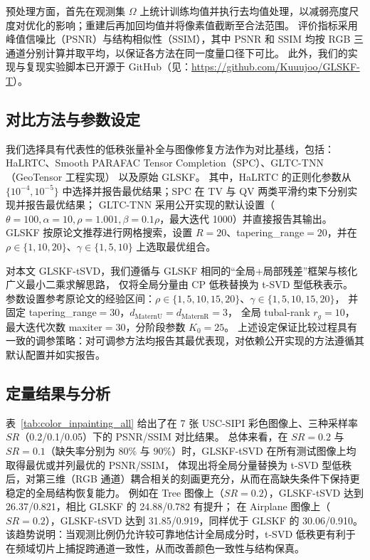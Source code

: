 \documentclass[UTF8]{ctexart}
\begin{document}
预处理方面，首先在观测集 $\Omega$ 上统计训练均值并执行去均值处理，以减弱亮度尺度对优化的影响；重建后再加回均值并将像素值截断至合法范围。
评价指标采用峰值信噪比（PSNR）与结构相似性（SSIM）\cite{wang2004ssim}，其中 PSNR 和 SSIM 均按 RGB 三通道分别计算并取平均，以保证各方法在同一度量口径下可比。
此外，我们的实现与复现实验脚本已开源于 GitHub（见：\url{https://github.com/Kuuujoo/GLSKF-T}）。

\subsection{对比方法与参数设定}

我们选择具有代表性的低秩张量补全与图像修复方法作为对比基线，包括：HaLRTC\cite{liu2013tensor}、Smooth PARAFAC Tensor Completion（SPC）\cite{yokota2016smooth}、GLTC-TNN（GeoTensor 工程实现）\cite{chen2025geotensor} 以及原始 GLSKF\cite{lei2024glskf}。
其中，HaLRTC 的正则化参数从 $\{10^{-4},10^{-5}\}$ 中选择并报告最优结果；SPC 在 TV 与 QV 两类平滑约束下分别实现并报告最优结果；
GLTC-TNN 采用公开实现的默认设置（$\theta=100,\alpha=10,\rho=1.001,\beta=0.1\rho$，最大迭代 1000）并直接报告其输出\cite{chen2025geotensor}。
GLSKF 按原论文推荐进行网格搜索，设置 $R=20$、tapering\_range$=20$，并在 $\rho\in\{1,10,20\}$、$\gamma\in\{1,5,10\}$ 上选取最优组合\cite{lei2024glskf}。

对本文 GLSKF-tSVD，我们遵循与 GLSKF 相同的“全局+局部残差”框架与核化广义最小二乘求解思路\cite{lei2024glskf}，
仅将全局分量由 CP 低秩替换为 t-SVD 型低秩表示\cite{kilmer2013operators}。
参数设置参考原论文的经验区间：$\rho\in\{1,5,10,15,20\}$、$\gamma\in\{1,5,10,15,20\}$，
并固定 tapering\_range$=30$，$d_{\text{MaternU}}=d_{\text{MaternR}}=3$，
全局 tubal-rank $r_g=10$，最大迭代次数 maxiter$=30$，分阶段参数 $K_0=25$。
上述设定保证比较过程具有一致的调参策略：对可调参方法均报告其最优表现，对依赖公开实现的方法遵循其默认配置并如实报告。

\subsection{定量结果与分析}

表~\ref{tab:color_inpainting_all} 给出了在 7 张 USC-SIPI 彩色图像上、三种采样率 $SR$（0.2/0.1/0.05）下的 PSNR/SSIM 对比结果。
总体来看，在 $SR=0.2$ 与 $SR=0.1$（缺失率分别为 $80\%$ 与 $90\%$）时，GLSKF-tSVD 在所有测试图像上均取得最优或并列最优的 PSNR/SSIM，
体现出将全局分量替换为 t-SVD 型低秩后，对第三维（RGB 通道）耦合相关的刻画更充分，从而在高缺失条件下保持更稳定的全局结构恢复能力\cite{kilmer2013operators}。
例如在 Tree 图像上（$SR=0.2$），GLSKF-tSVD 达到 26.37/0.821，相比 GLSKF 的 24.88/0.782 有提升；
在 Airplane 图像上（$SR=0.2$），GLSKF-tSVD 达到 31.85/0.919，同样优于 GLSKF 的 30.06/0.910。
该趋势说明：当观测比例仍允许较可靠地估计全局成分时，t-SVD 低秩更有利于在频域切片上捕捉跨通道一致性，从而改善颜色一致性与结构保真\cite{zhang2017tsvd}。
\end{document}
